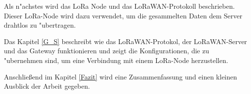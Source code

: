 Als n"achstes wird das LoRa Node und das LoRaWAN-Protokoll beschrieben. Dieser LoRa-Node wird dazu verwendet, um die gesammelten Daten dem Server drahtlos zu "ubertragen.

Das Kapitel \ref{G_S} beschreibt wie das LoRaWAN-Protokol, der LoRaWAN-Server und das Gateway funktionieren und zeigt die Konfigurationen, die zu "ubernehmen sind, um eine Verbindung mit einem LoRa-Node herzustellen.

Anschlie\ss{}end im Kapitel \ref{Fazit} wird eine Zusammenfassung und einen kleinen Ausblick der Arbeit gegeben.
   